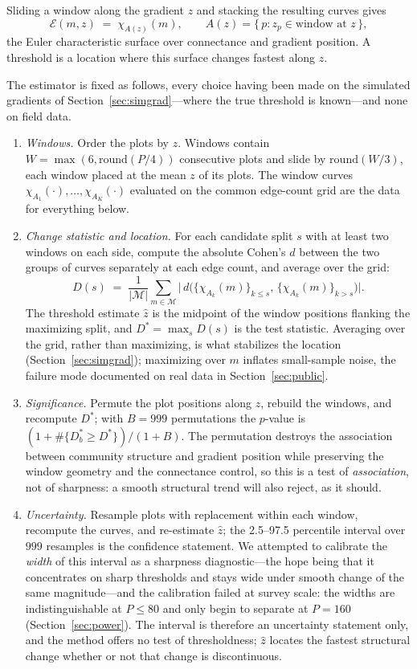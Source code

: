 \documentclass[review,12pt,authoryear]{elsarticle}
\theoremstyle{remark}
\begin{document}
Sliding a window along the gradient $z$ and stacking the resulting curves gives
\[
  \mathcal{E}(m, z) \;=\; \chi_{A(z)}(m),
  \qquad A(z) = \{\,p : z_p \in \text{window at } z\,\},
\]
the Euler characteristic surface over connectance and gradient position. A
threshold is a location where this surface changes fastest along $z$.

The estimator is fixed as follows, every choice having been made on the
simulated gradients of Section~\ref{sec:simgrad}---where the true threshold is
known---and none on field data.

\begin{enumerate}
\item \emph{Windows.} Order the plots by $z$. Windows contain
$W = \max(6, \mathrm{round}(P/4))$ consecutive plots and slide by
$\mathrm{round}(W/3)$, each window placed at the mean $z$ of its plots. The
window curves $\chi_{A_1}(\cdot), \dots, \chi_{A_K}(\cdot)$ evaluated on the
common edge-count grid are the data for everything below.
\item \emph{Change statistic and location.} For each candidate split $s$ with at
least two windows on each side, compute the absolute Cohen's $d$ between the
two groups of curves separately at each edge count, and average over the grid:
\[
  D(s) \;=\; \frac{1}{|\mathcal M|}\sum_{m \in \mathcal M}
  \bigl|\,d\bigl(\{\chi_{A_k}(m)\}_{k \le s},\,
               \{\chi_{A_k}(m)\}_{k > s}\bigr)\bigr| .
\]
The threshold estimate $\hat z$ is the midpoint of the window positions
flanking the maximizing split, and $D^\ast = \max_s D(s)$ is the test
statistic. Averaging over the grid, rather than maximizing, is what
stabilizes the location (Section~\ref{sec:simgrad}); maximizing over $m$
inflates small-sample noise, the failure mode documented on real data in
Section~\ref{sec:public}.
\item \emph{Significance.} Permute the plot positions along $z$, rebuild the
windows, and recompute $D^\ast$; with $B = 999$ permutations the $p$-value is
$(1 + \#\{D^\ast_b \ge D^\ast\})/(1+B)$. The permutation destroys the
association between community structure and gradient position while preserving
the window geometry and the connectance control, so this is a test of
\emph{association}, not of sharpness: a smooth structural trend will also
reject, as it should.
\item \emph{Uncertainty.} Resample plots with replacement within
each window, recompute the curves, and re-estimate $\hat z$; the 2.5--97.5
percentile interval over $999$ resamples is the confidence statement. We
attempted to calibrate the \emph{width} of this interval as a sharpness
diagnostic---the hope being that it concentrates on sharp thresholds and
stays wide under smooth change of the same magnitude---and the calibration
failed at survey scale: the widths are indistinguishable at $P \le 80$ and
only begin to separate at $P = 160$ (Section~\ref{sec:power}). The interval is therefore an uncertainty statement
only, and the method offers no test of thresholdness; $\hat z$ locates the
fastest structural change whether or not that change is discontinuous.
\end{enumerate}
\end{document}
